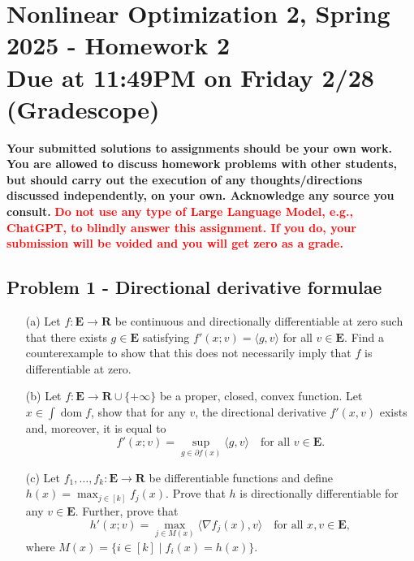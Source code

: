 \documentclass[11pt]{article}
\date{}
\title{}
\newcommand{\RR}{\mathbf{R}}
\newcommand{\EEE}{\mathbf{E}}
\newcommand{\dom}{\operatorname{dom}}
\begin{document}
\section*{\textbf{Nonlinear Optimization 2, Spring 2025 - Homework 2} \\ Due at 11:49PM on Friday 2/28 (Gradescope)}
\label{sec:org2a8ed46}
\textbf{Your submitted solutions to assignments should be your own work. You are allowed to discuss homework problems with other students, but should carry out the execution of any thoughts/directions discussed independently, on your own. Acknowledge any source you consult.}
\textbf{\textcolor{red}{Do not use any type of Large Language Model, e.g., ChatGPT, to blindly answer this assignment. If you do, your submission will be voided and you will get zero as a grade.}} \vspace{.5cm}
\subsection*{Problem 1 - Directional derivative formulae}
\label{sec:org8b5dcc8}
\begin{itemize}
\item[(a)] Let $f \colon \EEE \rightarrow \RR$ be continuous and directionally differentiable at zero such that there exists $g\in \EEE$ satisfying  $f'(x; v) = \langle g, v \rangle$ for all $v \in \EEE$. Find a counterexample to show that this does not necessarily imply that $f$ is differentiable at zero.
\item[(b)] Let $f \colon \EEE \rightarrow \RR \cup \{+ \infty\}$ be a proper, closed, convex function. Let $x \in \int \dom f$, show that for any $v$, the directional derivative $f'(x, v)$ exists and, moreover, it is equal to $$ f'(x; v) = \sup_{g \in \partial f(x)} \langle g, v\rangle \quad \text{for all } v \in \EEE.$$
\item[(c)] Let $f_{1}, \dots, f_{k} \colon \EEE \rightarrow \RR$ be differentiable functions and define $h(x) = \max_{j \in [k]} f_{j}(x)$. Prove that $h$ is directionally differentiable for any $v \in \EEE.$ Further, prove that
$$
h'(x; v) = \max_{j \in M(x)} \langle \nabla f_{j}(x), v\rangle \quad \text{for all }x, v \in \EEE,
$$
where $M(x) = \{i \in [k] \mid f_{i}(x) = h(x)\}$.
\end{itemize}
\end{document}
